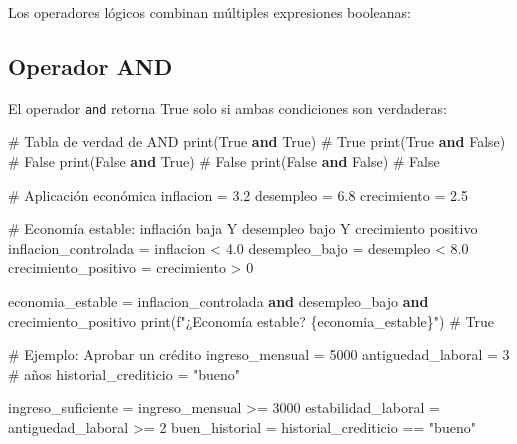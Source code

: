 \documentclass[
  doc,
  floatsintext,
  longtable,
  a4paper,
  nolmodern,
  notxfonts,
  notimes,
  12pt,
  colorlinks=true,linkcolor=blue,citecolor=blue,urlcolor=blue]{apa7}
\newenvironment{Shaded}{\begin{snugshade}}{\end{snugshade}}
\newcommand{\BuiltInTok}[1]{\textcolor[rgb]{0.00,0.23,0.31}{#1}}
\newcommand{\CommentTok}[1]{\textcolor[rgb]{0.37,0.37,0.37}{#1}}
\newcommand{\DecValTok}[1]{\textcolor[rgb]{0.68,0.00,0.00}{#1}}
\newcommand{\FloatTok}[1]{\textcolor[rgb]{0.68,0.00,0.00}{#1}}
\newcommand{\KeywordTok}[1]{\textcolor[rgb]{0.00,0.23,0.31}{\textbf{#1}}}
\newcommand{\NormalTok}[1]{\textcolor[rgb]{0.00,0.23,0.31}{#1}}
\newcommand{\OperatorTok}[1]{\textcolor[rgb]{0.37,0.37,0.37}{#1}}
\newcommand{\SpecialCharTok}[1]{\textcolor[rgb]{0.37,0.37,0.37}{#1}}
\newcommand{\SpecialStringTok}[1]{\textcolor[rgb]{0.13,0.47,0.30}{#1}}
\newcommand{\StringTok}[1]{\textcolor[rgb]{0.13,0.47,0.30}{#1}}
\newcommand{\VariableTok}[1]{\textcolor[rgb]{0.07,0.07,0.07}{#1}}
\begin{document}
Los operadores lógicos combinan múltiples expresiones booleanas:

\subsection{Operador AND}\label{operador-and}

El operador \texttt{and} retorna True solo si ambas condiciones son
verdaderas:

\begin{Shaded}
\begin{Highlighting}[]
\CommentTok{\# Tabla de verdad de AND}
\BuiltInTok{print}\NormalTok{(}\VariableTok{True} \KeywordTok{and} \VariableTok{True}\NormalTok{)    }\CommentTok{\# True}
\BuiltInTok{print}\NormalTok{(}\VariableTok{True} \KeywordTok{and} \VariableTok{False}\NormalTok{)   }\CommentTok{\# False}
\BuiltInTok{print}\NormalTok{(}\VariableTok{False} \KeywordTok{and} \VariableTok{True}\NormalTok{)   }\CommentTok{\# False}
\BuiltInTok{print}\NormalTok{(}\VariableTok{False} \KeywordTok{and} \VariableTok{False}\NormalTok{)  }\CommentTok{\# False}

\CommentTok{\# Aplicación económica}
\NormalTok{inflacion }\OperatorTok{=} \FloatTok{3.2}
\NormalTok{desempleo }\OperatorTok{=} \FloatTok{6.8}
\NormalTok{crecimiento }\OperatorTok{=} \FloatTok{2.5}

\CommentTok{\# Economía estable: inflación baja Y desempleo bajo Y crecimiento positivo}
\NormalTok{inflacion\_controlada }\OperatorTok{=}\NormalTok{ inflacion }\OperatorTok{\textless{}} \FloatTok{4.0}
\NormalTok{desempleo\_bajo }\OperatorTok{=}\NormalTok{ desempleo }\OperatorTok{\textless{}} \FloatTok{8.0}
\NormalTok{crecimiento\_positivo }\OperatorTok{=}\NormalTok{ crecimiento }\OperatorTok{\textgreater{}} \DecValTok{0}

\NormalTok{economia\_estable }\OperatorTok{=}\NormalTok{ inflacion\_controlada }\KeywordTok{and}\NormalTok{ desempleo\_bajo }\KeywordTok{and}\NormalTok{ crecimiento\_positivo}
\BuiltInTok{print}\NormalTok{(}\SpecialStringTok{f"¿Economía estable? }\SpecialCharTok{\{}\NormalTok{economia\_estable}\SpecialCharTok{\}}\SpecialStringTok{"}\NormalTok{)  }\CommentTok{\# True}

\CommentTok{\# Ejemplo: Aprobar un crédito}
\NormalTok{ingreso\_mensual }\OperatorTok{=} \DecValTok{5000}
\NormalTok{antiguedad\_laboral }\OperatorTok{=} \DecValTok{3}  \CommentTok{\# años}
\NormalTok{historial\_crediticio }\OperatorTok{=} \StringTok{"bueno"}

\NormalTok{ingreso\_suficiente }\OperatorTok{=}\NormalTok{ ingreso\_mensual }\OperatorTok{\textgreater{}=} \DecValTok{3000}
\NormalTok{estabilidad\_laboral }\OperatorTok{=}\NormalTok{ antiguedad\_laboral }\OperatorTok{\textgreater{}=} \DecValTok{2}
\NormalTok{buen\_historial }\OperatorTok{=}\NormalTok{ historial\_crediticio }\OperatorTok{==} \StringTok{"bueno"}


\end{Highlighting}
\end{Shaded}
\end{document}
